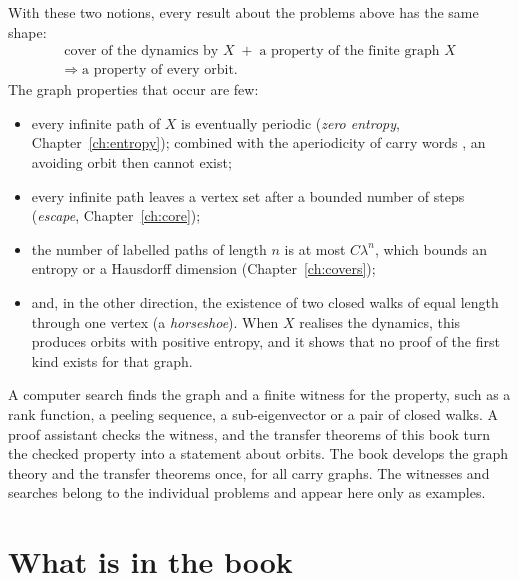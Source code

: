 With these two notions, every result about the problems above has the same shape:
\[
  \begin{gathered}
  \text{cover of the dynamics by }X\;+\;\text{a property of the finite graph }X\\
  \Longrightarrow\;\text{a property of every orbit.}
  \end{gathered}
\]
The graph properties that occur are few:
\begin{itemize}
\item every infinite path of \(X\) is eventually periodic (\emph{zero entropy},
  Chapter~\ref{ch:entropy}); combined with the aperiodicity of carry words
  \cite[Lemma~2]{DN05}, an avoiding orbit then cannot exist;
\item every infinite path leaves a vertex set after a bounded number of steps
  (\emph{escape}, Chapter~\ref{ch:core});
\item the number of labelled paths of length \(n\) is at most \(C\lambda^n\), which bounds an
  entropy or a Hausdorff dimension (Chapter~\ref{ch:covers});
\item and, in the other direction, the existence of two closed walks of equal length
  through one vertex (a \emph{horseshoe}). When \(X\) realises the dynamics, this produces
  orbits with positive entropy, and it shows that no proof of the first kind exists for that
  graph.
\end{itemize}
A computer search finds the graph and a finite witness for the property, such as a rank
function, a peeling sequence, a sub-eigenvector or a pair of closed walks. A proof assistant
checks the witness, and the transfer theorems of this book turn the checked property into a
statement about orbits. The book develops the graph theory and the transfer theorems once,
for all carry graphs. The witnesses and searches belong to the individual problems and appear
here only as examples.

\section{What is in the book}

